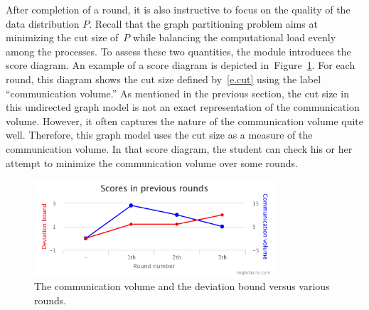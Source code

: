 \documentclass[12pt, twoside]{book}
\newcommand{\figref}[1]{Figure~\protect\ref{#1}}
\begin{document}
After completion of a round, it is also instructive to focus on the quality of the data
distribution $P$. Recall that the graph partitioning problem aims at minimizing the cut
size of~$P$ while balancing the computational load evenly among the processes. To assess
these two quantities, the module introduces the score diagram. An example of a score
diagram is depicted in~\figref{f.score}. For each round, this diagram shows the cut size
defined by~\eqref{e.cut} using the label ``communication volume.'' As mentioned in the
previous section, the cut size in this undirected graph model is not an exact
representation of the communication volume. However, it often captures the nature of the
communication volume quite well. Therefore, this graph model uses the cut size as a
measure of the communication volume. In that score diagram, the student can check his or
her attempt to minimize the communication volume over some rounds.

\begin{figure}
\centering
\includegraphics[width=0.8\textwidth]{chart}
\caption{The communication volume and the deviation bound versus various rounds.}
\label{f.score}
\end{figure}
\end{document}
